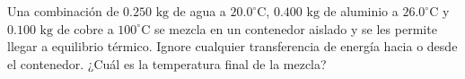 \item Una combinación de $0.250 \text{ kg}$ de agua a $20.0 ^\circ\text{C}$, $0.400 \text{ kg}$ de aluminio a $26.0 ^\circ\text{C}$ y $0.100 \text{ kg}$ de cobre a $100 ^\circ\text{C}$ se mezcla en un contenedor aislado y se les permite llegar a equilibrio térmico. Ignore cualquier transferencia de energía hacia o desde el contenedor. ¿Cuál es la temperatura final de la mezcla?
